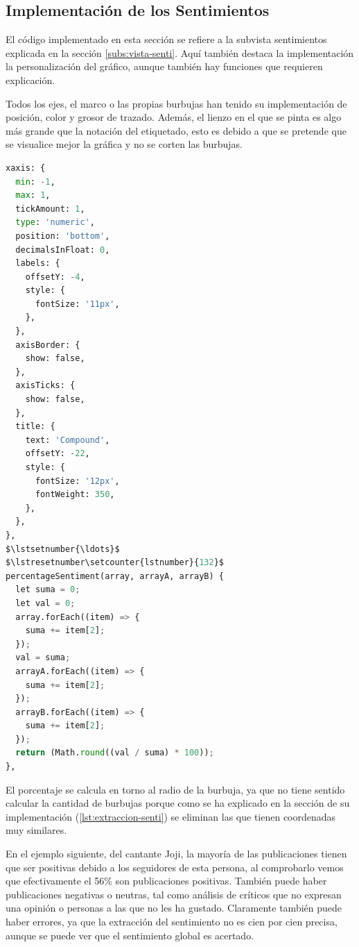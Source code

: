\subsection{Implementación de los Sentimientos}
El código implementado en esta sección se refiere a la subvista sentimientos explicada en la sección \ref{subs:vista-senti}. Aquí también destaca la implementación la personalización del gráfico, aunque también hay funciones que requieren explicación.

\vspace{0.3cm}

Todos los ejes, el marco o las propias burbujas han tenido su implementación de posición, color y grosor de trazado. Además, el lienzo en el que se pinta es algo más grande que la notación del etiquetado, esto es debido a que se pretende que se visualice mejor la gráfica y no se corten las burbujas.

\vspace{0.3cm}

\begin{lstlisting}[caption=Diferencias destacables de la implementación de los sentimientos,language=Python, mathescape=true]
xaxis: {
  min: -1,
  max: 1,
  tickAmount: 1,
  type: 'numeric',
  position: 'bottom',
  decimalsInFloat: 0,
  labels: {
    offsetY: -4,
    style: {
      fontSize: '11px',
    },
  },
  axisBorder: {
    show: false,
  },
  axisTicks: {
    show: false,
  },
  title: {
    text: 'Compound',
    offsetY: -22,
    style: {
      fontSize: '12px',
      fontWeight: 350,
    },
  },
},
$\lstsetnumber{\ldots}$
$\lstresetnumber\setcounter{lstnumber}{132}$
percentageSentiment(array, arrayA, arrayB) {
  let suma = 0;
  let val = 0;
  array.forEach((item) => {
    suma += item[2];
  });
  val = suma;
  arrayA.forEach((item) => {
    suma += item[2];
  });
  arrayB.forEach((item) => {
    suma += item[2];
  });
  return (Math.round((val / suma) * 100));
},
\end{lstlisting}

El porcentaje se calcula en torno al radio de la burbuja, ya que no tiene sentido calcular la cantidad de burbujas porque como se ha explicado en la sección de su implementación (\ref{lst:extraccion-senti}) se eliminan las que tienen coordenadas muy similares.

\vspace{0.3cm}

En el ejemplo siguiente, del cantante Joji, la mayoría de las publicaciones tienen que ser positivas debido a los seguidores de esta persona, al comprobarlo vemos que efectivamente el 56\% son publicaciones positivas. También puede haber publicaciones negativas o neutras, tal como análisis de críticos que no expresan una opinión o personas a las que no les ha gustado. Claramente también puede haber errores, ya que la extracción del sentimiento no es cien por cien precisa, aunque se puede ver que el sentimiento global es acertado.

